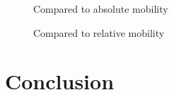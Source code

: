 \begin{figure}[H]
    \centering
    \caption{Compared to absolute mobility}
    \label{fig:abs_pro}
\end{figure}

\begin{figure}[H]
    \centering
    \caption{Compared to relative mobility}
    \label{fig:rel_pro}
\end{figure}


\section{Conclusion} \label{sec:conclusion}

